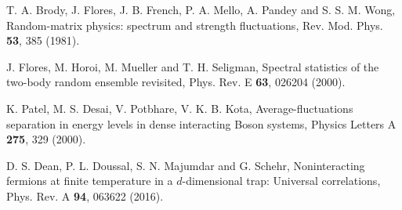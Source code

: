 \begin{thebibliography}{99}
 T.  A.  Brody,  J.  Flores,  J.  B.  French,  P.  A.  Mello,  A.  Pandey and S.  S.  M.  Wong,  Random-matrix physics: spectrum and strength fluctuations, Rev.  Mod.  Phys.  {\bf 53}, 385 (1981).

 J.  Flores, M.  Horoi, M.  Mueller and T.  H.  Seligman,  Spectral statistics of the two-body random ensemble revisited,  Phys.  Rev.  E {\bf 63}, 026204 (2000).

 K. Patel, M. S. Desai, V. Potbhare, V. K. B.  Kota, Average-fluctuations separation in energy levels in dense interacting Boson systems, Physics Letters A {\bf 275}, 329 (2000).

 D. S. Dean, P. L. Doussal, S. N. Majumdar and G. Schehr, Noninteracting fermions at finite temperature in a $d$-dimensional trap: Universal correlations, Phys. Rev. A {\bf 94}, 063622 (2016).

\end{thebibliography}

\ed